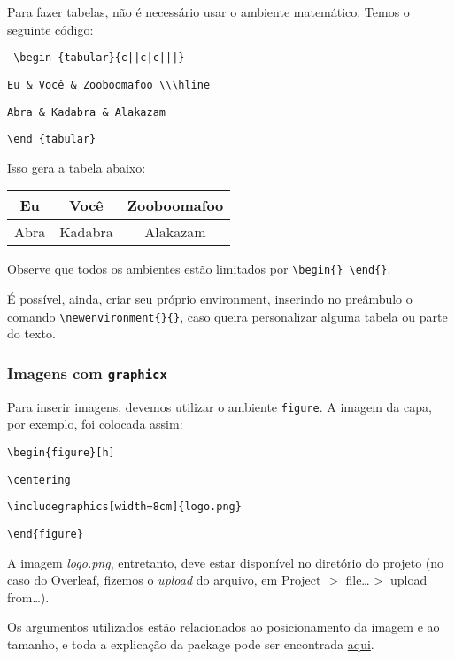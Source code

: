 \documentclass[12pt,a4paper]{article}
\begin{document}
Para fazer tabelas, não é necessário usar o ambiente matemático. Temos o seguinte código:

\texttt{ \textbackslash begin \{tabular\}\{c||c|c|||\}}

\texttt{Eu \& Você \& Zooboomafoo \textbackslash\textbackslash  \textbackslash hline}

\texttt{Abra \& Kadabra \& Alakazam}

\texttt{\textbackslash end \{tabular\} }

\vspace{5mm}

Isso gera a tabela abaixo:

\begin{tabular}{c||c|c|||}
Eu & Você & Zooboomafoo \\ \hline Abra & Kadabra & Alakazam
\end{tabular}

\vspace{5mm}

Observe que todos os ambientes estão limitados por \texttt{\textbackslash begin\{\}   \textbackslash end\{\}}.

É possível, ainda, criar seu próprio environment, inserindo no preâmbulo o comando \texttt{\textbackslash newenvironment\{\}\{\}}, caso queira personalizar alguma tabela ou parte do texto.

\subsubsection{Imagens com \texttt{graphicx}}

Para inserir imagens, devemos utilizar o ambiente \texttt{figure}. A imagem da capa, por exemplo, foi colocada assim:

\noindent\texttt{\textbackslash begin\{figure\}[h]}

\texttt{\textbackslash centering}

\texttt{\textbackslash includegraphics[width=8cm]\{logo.png\}}

\noindent\texttt{\textbackslash end\{figure\}}



A imagem \textit{logo.png}, entretanto, deve estar disponível no diretório do projeto (no caso do Overleaf, fizemos o \textit{upload} do arquivo, em \textsf{Project $>$ file\dots $>$ upload from\dots}).

Os argumentos utilizados estão relacionados ao posicionamento da imagem e ao tamanho, e toda a explicação da package pode ser encontrada \href{https://pt.sharelatex.com/learn/Inserting_Images}{aqui}.
\end{document}
